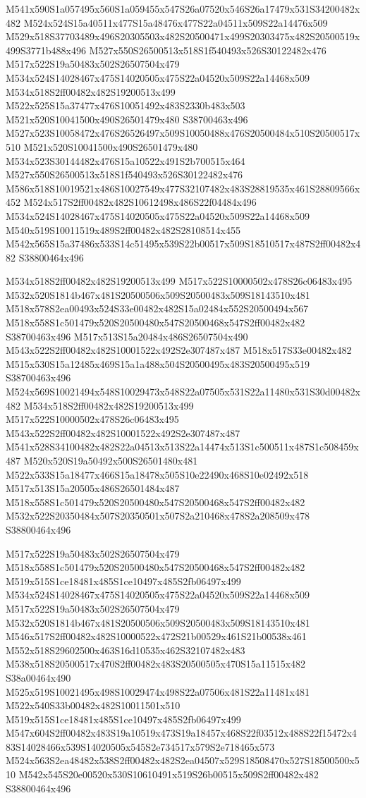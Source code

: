 \documentclass{article}
\begin{document}
\begin{multicols}{2}
M541x590S1a057495x560S1a059455x547S26a07520x546S26a17479x531S34200482x482 M524x524S15a40511x477S15a48476x477S22a04511x509S22a14476x509 M529x518S37703489x496S20305503x482S20500471x499S20303475x482S20500519x499S3771b488x496 M527x550S26500513x518S1f540493x526S30122482x476 M517x522S19a50483x502S26507504x479 M534x524S14028467x475S14020505x475S22a04520x509S22a14468x509 M534x518S2ff00482x482S19200513x499 M522x525S15a37477x476S10051492x483S2330b483x503 M521x520S10041500x490S26501479x480 S38700463x496 M527x523S10058472x476S26526497x509S10050488x476S20500484x510S20500517x510 M521x520S10041500x490S26501479x480 M534x523S30144482x476S15a10522x491S2b700515x464 M527x550S26500513x518S1f540493x526S30122482x476 M586x518S10019521x486S10027549x477S32107482x483S28819535x461S28809566x452 M524x517S2ff00482x482S10612498x486S22f04484x496 M534x524S14028467x475S14020505x475S22a04520x509S22a14468x509 M540x519S10011519x489S2ff00482x482S28108514x455 M542x565S15a37486x533S14c51495x539S22b00517x509S18510517x487S2ff00482x482 S38800464x496

M534x518S2ff00482x482S19200513x499 M517x522S10000502x478S26c06483x495 M532x520S1814b467x481S20500506x509S20500483x509S18143510x481 M518x578S2ea00493x524S33e00482x482S15a02484x552S20500494x567 M518x558S1c501479x520S20500480x547S20500468x547S2ff00482x482 S38700463x496 M517x513S15a20484x486S26507504x490 M543x522S2ff00482x482S10001522x492S2e307487x487 M518x517S33e00482x482 M515x530S15a12485x469S15a1a488x504S20500495x483S20500495x519 S38700463x496 M524x569S10021494x548S10029473x548S22a07505x531S22a11480x531S30d00482x482 M534x518S2ff00482x482S19200513x499 M517x522S10000502x478S26c06483x495 M543x522S2ff00482x482S10001522x492S2e307487x487 M541x528S34100482x482S22a04513x513S22a14474x513S1c500511x487S1c508459x487 M520x520S19a50492x500S26501480x481 M522x533S15a18477x466S15a18478x505S10e22490x468S10e02492x518 M517x513S15a20505x486S26501484x487 M518x558S1c501479x520S20500480x547S20500468x547S2ff00482x482 M532x522S20350484x507S20350501x507S2a210468x478S2a208509x478 S38800464x496

M517x522S19a50483x502S26507504x479 M518x558S1c501479x520S20500480x547S20500468x547S2ff00482x482 M519x515S1ce18481x485S1ce10497x485S2fb06497x499 M534x524S14028467x475S14020505x475S22a04520x509S22a14468x509 M517x522S19a50483x502S26507504x479 M532x520S1814b467x481S20500506x509S20500483x509S18143510x481 M546x517S2ff00482x482S10000522x472S21b00529x461S21b00538x461 M552x518S29602500x463S16d10535x462S32107482x483 M538x518S20500517x470S2ff00482x483S20500505x470S15a11515x482 S38a00464x490 M525x519S10021495x498S10029474x498S22a07506x481S22a11481x481 M522x540S33b00482x482S10011501x510 M519x515S1ce18481x485S1ce10497x485S2fb06497x499 M547x604S2ff00482x483S19a10519x473S19a18457x468S22f03512x488S22f15472x483S14028466x539S14020505x545S2e734517x579S2e718465x573 M524x563S2ea48482x538S2ff00482x482S2ea04507x529S18508470x527S18500500x510 M542x545S20e00520x530S10610491x519S26b00515x509S2ff00482x482 S38800464x496


\end{multicols}
\end{document}
